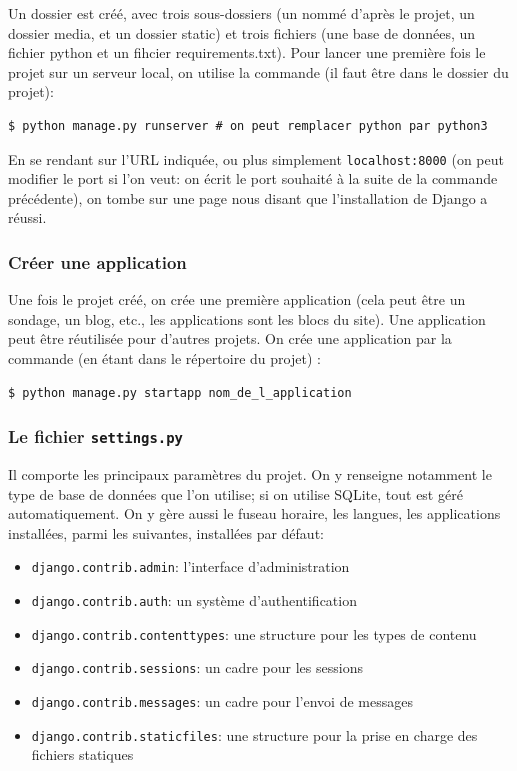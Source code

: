 \documentclass[a4paper, 10pt]{article}
\newcommand{\code}[1]{{\small\texttt{#1}}}
\begin{document}
Un dossier est créé, avec trois sous-dossiers (un nommé d'après le projet, un dossier media, et un dossier static) et trois fichiers (une base de données, un fichier python et un fihcier requirements.txt). Pour lancer une première fois le projet sur un serveur local, on utilise la commande (il faut être dans le dossier du projet):
\begin{verbatim}
$ python manage.py runserver # on peut remplacer python par python3
\end{verbatim}
En se rendant sur l’URL indiquée, ou plus simplement \code{localhost:8000} (on peut modifier le port si l'on veut: on écrit le port souhaité à la suite de la commande précédente), on tombe sur une page nous disant que l'installation de Django a réussi.

\subsubsection{Créer une application}
Une fois le projet créé, on crée une première application (cela peut être un sondage, un blog, etc., les applications sont les blocs du site). Une application peut être réutilisée pour d'autres projets. On crée une application par la commande (en étant dans le répertoire du projet) :
\begin{verbatim}
$ python manage.py startapp nom_de_l_application
\end{verbatim}

\subsubsection{Le fichier \code{settings.py}}
Il comporte les principaux paramètres du projet. On y renseigne notamment le type de base de données que l'on utilise; si on utilise SQLite, tout est géré automatiquement. On y gère aussi le fuseau horaire, les langues, les applications installées, parmi les suivantes, installées par défaut:
\begin{itemize}
	\item \code{django.contrib.admin}: l'interface d'administration
	\item \code{django.contrib.auth}: un système d'authentification
	\item \code{django.contrib.contenttypes}: une structure pour les types de contenu
	\item \code{django.contrib.sessions}: un cadre pour les sessions
	\item \code{django.contrib.messages}: un cadre pour l'envoi de messages
	\item \code{django.contrib.staticfiles}: une structure pour la prise en charge des fichiers statiques
\end{itemize}
\end{document}
